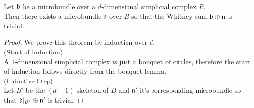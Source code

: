 \theorem{()}
\\ Let $\mathfrak{b}$ be a microbundle over a $d$-dimensional simplicial complex $B$.
\\ Then there exists a microbundle $\mathfrak{n}$ over $B$ so that the Whitney sum $\mathfrak{b} \oplus \mathfrak{n}$ is trivial.
\begin{proof}
We prove this theorem by induction over $d$.
\\ (Start of induction)
\\ A $1$-dimensional simplicial complex is just a bouquet of circles, therefore the start of induction follows directly from the bouquet lemma.   
\\ (Inductive Step)
\\ Let $B'$ be the $(d - 1)$-skeleton of $B$ and $\mathfrak{n}'$ it's corresponding microbundle so that $\mathfrak{b} \vert_{B'} \oplus \mathfrak{n}'$ is trivial.
\end{proof}